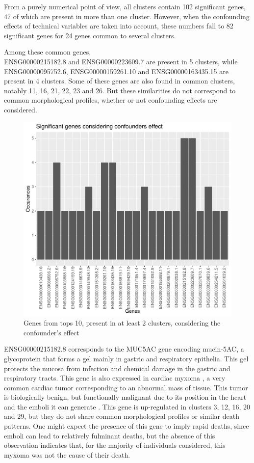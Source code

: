 \documentclass[a4paper, 11pt]{article}
\begin{document}
\begin{multicols}{2}
From a purely numerical point of view, all clusters contain 102 significant genes, 47 of which are present in more than one cluster. However, when the confounding effects of technical variables are taken into account, these numbers fall to 82 significant genes for 24 genes common to several clusters. 

Among these common genes,\\
ENSG00000215182.8 and ENSG00000223609.7 are present in 5 clusters, while ENSG00000095752.6, ENSG00000159261.10 and ENSG00000163435.15 are present in 4 clusters. Some of these genes are also found in common clusters, notably 11, 16, 21, 22, 23 and 26. But these similarities do not correspond to common morphological profiles, whether or not confounding effects are considered. 
\begin{figure}[H]
	\centering
	\includegraphics[width=\columnwidth]{figures/final_analysis/SigGenesConsideringConf}
	\caption{Genes from tops 10, present in at least 2 clusters, considering the confounder's effect}
	\label{fig:genesOcc}
\end{figure}
ENSG00000215182.8 corresponds to the MUC5AC gene encoding mucin-5AC, a glycoprotein that forms a gel mainly in gastric and respiratory epithelia. This gel protects the mucosa from infection and chemical damage in the gastric and respiratory tracts. This gene is also expressed in cardiac myxoma \citep{Islam2022}, a very common cardiac tumor corresponding to an abnormal mass of tissue. This tumor is biologically benign, but functionally malignant due to its position in the heart and the emboli it can generate  \citep{Chu2004}. This gene is up-regulated in clusters 3, 12, 16, 20 and 29, but they do not share common morphological profiles or similar death patterns. One might expect the presence of this gene to imply rapid deaths, since emboli can lead to relatively fulminant deaths, but the absence of this observation indicates that, for the majority of individuals considered, this myxoma was not the cause of their death. 


\end{multicols}
\end{document}
